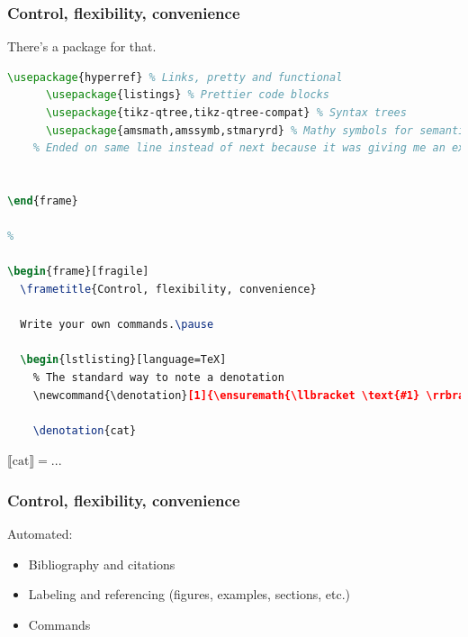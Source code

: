 \documentclass[dvipsnames]{beamer}\usepackage[]{graphicx}\usepackage[]{color}
\begin{document}
%

\begin{frame}[fragile]
  \frametitle{Control, flexibility, convenience}
    
    There's a package for that.\pause
    
    \begin{lstlisting}[language=TeX]
      \usepackage{hyperref} % Links, pretty and functional
      \usepackage{listings} % Prettier code blocks
      \usepackage{tikz-qtree,tikz-qtree-compat} % Syntax trees
      \usepackage{amsmath,amssymb,stmaryrd} % Mathy symbols for semantics \end{lstlisting}

  
\end{frame}

%

\begin{frame}[fragile]
  \frametitle{Control, flexibility, convenience}
  
  Write your own commands.\pause
  
  \begin{lstlisting}[language=TeX]
    % The standard way to note a denotation
    \newcommand{\denotation}[1]{\ensuremath{\llbracket \text{#1} \rrbracket}} 
    
    \denotation{cat} \end{lstlisting}
  
  
  \newcommand{\denotation}[1]{\ensuremath{\llbracket \text{#1} \rrbracket = }}
  \begin{exe}
    \ex $\denotation{cat} ...$
  \end{exe}
  
\end{frame}

%

\begin{frame}[fragile]
  \frametitle{Control, flexibility, convenience}
  
  Automated:\pause
  \begin{itemize}
    \item Bibliography and citations
    \item Labeling and referencing (figures, examples, sections, etc.)
    \item Commands 
  \end{itemize}
  
\end{frame}
\end{document}
